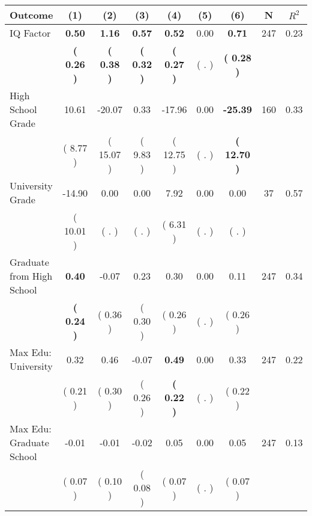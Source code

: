 \begin{tabular}{lcccccccc}
\toprule
 \textbf{Outcome} & \textbf{(1)} & \textbf{(2)} & \textbf{(3)} & \textbf{(4)} & \textbf{(5)} & \textbf{(6)} & \textbf{N} & \textbf{$ R^2$} \\
\midrule
IQ Factor & \textbf{     0.50} & \textbf{     1.16} & \textbf{     0.57} & \textbf{     0.52} &      0.00 & \textbf{     0.71} & 247 &       0.23 \\ 
 & \textbf{(     0.26 )} & \textbf{(     0.38 )} & \textbf{(     0.32 )} & \textbf{(     0.27 )} & (        . ) & \textbf{(     0.28 )} & \\
High School Grade &     10.61 &    -20.07 &      0.33 &    -17.96 &      0.00 & \textbf{   -25.39} & 160 &       0.33 \\ 
 & (     8.77 ) & (    15.07 ) & (     9.83 ) & (    12.75 ) & (        . ) & \textbf{(    12.70 )} & \\
University Grade &    -14.90 &      0.00 &      0.00 &      7.92 &      0.00 &      0.00 & 37 &       0.57 \\ 
 & (    10.01 ) & (        . ) & (        . ) & (     6.31 ) & (        . ) & (        . ) & \\
Graduate from High School & \textbf{     0.40} &     -0.07 &      0.23 &      0.30 &      0.00 &      0.11 & 247 &       0.34 \\ 
 & \textbf{(     0.24 )} & (     0.36 ) & (     0.30 ) & (     0.26 ) & (        . ) & (     0.26 ) & \\
Max Edu: University &      0.32 &      0.46 &     -0.07 & \textbf{     0.49} &      0.00 &      0.33 & 247 &       0.22 \\ 
 & (     0.21 ) & (     0.30 ) & (     0.26 ) & \textbf{(     0.22 )} & (        . ) & (     0.22 ) & \\
Max Edu: Graduate School &     -0.01 &     -0.01 &     -0.02 &      0.05 &      0.00 &      0.05 & 247 &       0.13 \\ 
 & (     0.07 ) & (     0.10 ) & (     0.08 ) & (     0.07 ) & (        . ) & (     0.07 ) & \\
\bottomrule
\end{tabular}
